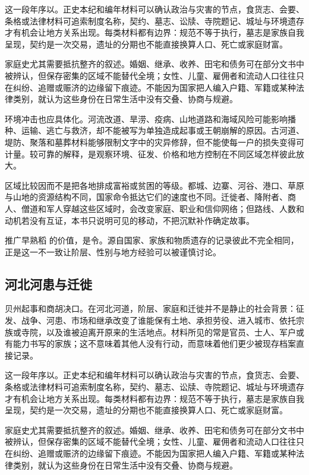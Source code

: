 这一段年序以。正史本纪和编年材料可以确认政治与灾害的节点，食货志、会要、条格或法律材料可追索制度名称，契约、墓志、讼牍、寺院题记、城址与环境遗存才有机会让地方关系出现。每类材料都有边界：规范不等于执行，墓志是家族自我呈现，契约是一次交易，遗址的分期也不能直接换算人口、死亡或家庭财富。

家庭史尤其需要抵抗整齐的叙述。婚姻、继承、收养、田宅和债务可在部分文书中被辨认，但保存密集的区域不能替代全境；女性、儿童、雇佣者和流动人口往往只在纠纷、追赠或赈济的边缘留下痕迹。不能因为国家把人编入户籍、军籍或某种法律类别，就认为这些身份在日常生活中没有交叠、协商与规避。

环境冲击也应具体化。河流改道、旱涝、疫病、山地道路和海域风险可能影响播种、运输、逃亡与救济，却不能被写为单独造成起事或王朝崩解的原因。古河道、堤防、聚落和墓葬材料能够限制文字中的灾异修辞，但不能使每一户的损失变得可计量。较可靠的解释，是观察环境、征发、价格和地方控制在不同区域怎样彼此放大。

区域比较因而不是把各地排成富裕或贫困的等级。都城、边寨、河谷、港口、草原与山地的资源结构不同，国家命令抵达它们的速度也不同。迁徙者、降附者、商人、僧道和军人穿越这些区域时，会改变家庭、职业和信仰网络；但路线、人数和动机若没有互证，本书只说明可见的移动，不把沉默补作确定故事。

推广早熟稻 的价值，是令。源自国家、家族和物质遗存的记录彼此不完全相同，正是这一不一致让阶层、性别与地方经验可以被谨慎讨论。

\subsection{河北河患与迁徙}

贝州起事和商胡决口。在河北河道，阶层、家庭和迁徙并不是静止的社会背景：征发、战争、河患、市场和继承改变了谁能保有土地、承担劳役、进入城市、依托宗族或寺院，以及谁被迫离开原来的生活地点。材料所见的常是官员、士人、军户或有能力书写的家族；这不意味着其他人没有行动，而意味着他们更少被现存档案直接记录。

这一段年序以。正史本纪和编年材料可以确认政治与灾害的节点，食货志、会要、条格或法律材料可追索制度名称，契约、墓志、讼牍、寺院题记、城址与环境遗存才有机会让地方关系出现。每类材料都有边界：规范不等于执行，墓志是家族自我呈现，契约是一次交易，遗址的分期也不能直接换算人口、死亡或家庭财富。

家庭史尤其需要抵抗整齐的叙述。婚姻、继承、收养、田宅和债务可在部分文书中被辨认，但保存密集的区域不能替代全境；女性、儿童、雇佣者和流动人口往往只在纠纷、追赠或赈济的边缘留下痕迹。不能因为国家把人编入户籍、军籍或某种法律类别，就认为这些身份在日常生活中没有交叠、协商与规避。

